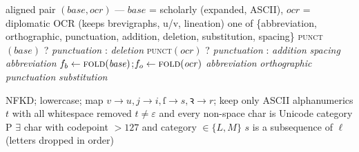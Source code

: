 \begin{algorithm}[htbp]
  \caption{Classify one aligned difference region (\texttt{classify\_region}).}
  \label{alg:classify}
  \begin{algorithmic}[1]
    \Require aligned pair $(\mathit{base},\mathit{ocr})$ --- $\mathit{base}$ = scholarly (expanded, ASCII),
             $\mathit{ocr}$ = diplomatic OCR (keeps brevigraphs, u/v, lineation)
    \Ensure  one of \{abbreviation, orthographic, punctuation, addition, deletion, substitution, spacing\}
     \Return \textsc{punct}$(\mathit{base})$ ? \textit{punctuation} : \textit{deletion} \EndIf
     \Return \textsc{punct}$(\mathit{ocr})$ ? \textit{punctuation} : \textit{addition} \EndIf
     \Return \textit{spacing}
         \EndIf
     \Return \textit{abbreviation}
         \EndIf
    \State $f_b \gets \textsc{fold}(\mathit{base})$;\quad $f_o \gets \textsc{fold}(\mathit{ocr})$
      \State \Return \textit{abbreviation} 
    \EndIf
     \Return \textit{orthographic}  \EndIf
     \Return \textit{punctuation} \EndIf
    \State \Return \textit{substitution} 

    \Statex\hrulefill
     NFKD; lowercase; map $v\!\to\!u,j\!\to\!i,ſ\!\to\!s,ꝛ\!\to\!r$;
        keep only ASCII alphanumerics \EndFunction
     $t$ with all whitespace removed \EndFunction
     $t\neq\varepsilon$ and every non-space char is Unicode category P \EndFunction
     $\exists$ char with codepoint $>127$ and category $\in\{L,M\}$ \EndFunction
     $s$ is a subsequence of $\ell$ (letters dropped in order) \EndFunction
  \end{algorithmic}
\end{algorithm}

